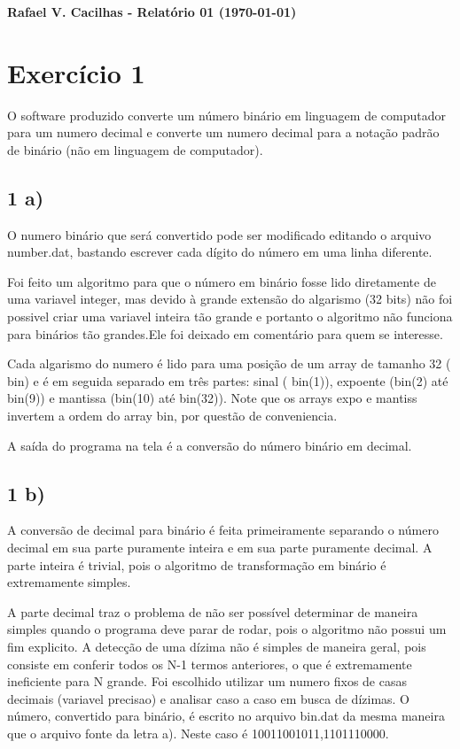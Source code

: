 \documentclass[a4wide]{report}
\begin{document}
\noindent
{\bf Rafael V. Cacilhas  - Relatório 01 (\today)}

\vspace{0.5cm}

\section*{Exercício 1}

O software produzido converte um número binário em linguagem de computador para um numero decimal e converte um numero decimal para a notação padrão de binário (não em linguagem de computador).

\subsection*{1 a) }
O numero binário que será convertido pode ser modificado editando o arquivo number.dat, bastando escrever cada dígito do número em uma linha diferente.

Foi feito um algoritmo para que o número em binário fosse lido diretamente de uma variavel integer, mas devido à grande extensão do algarismo (32 bits) não foi possivel criar uma variavel inteira tão grande e portanto o algoritmo não funciona para binários tão grandes.Ele foi deixado em comentário para quem se interesse.

Cada algarismo do numero é lido para uma posição de um array de tamanho 32 ( bin) e é em seguida separado em três partes: sinal ( bin(1)), expoente (bin(2) até bin(9)) e mantissa (bin(10) até bin(32)). Note que os arrays expo e mantiss invertem a ordem do array bin, por questão de conveniencia.

A saída do programa na tela é a conversão do número binário em decimal.

\subsection*{1 b) }

A conversão de decimal para binário é feita primeiramente separando o número decimal em sua parte puramente inteira e em sua parte puramente decimal. A parte inteira é trivial, pois o algoritmo de transformação em binário é extremamente simples.

A parte decimal traz o problema de não ser possível determinar de maneira simples quando o programa deve parar de rodar, pois o algoritmo não possui um fim explicito. A detecção de uma dízima não é simples de maneira geral, pois consiste em conferir todos os N-1 termos anteriores, o que é extremamente ineficiente para N grande. Foi escolhido utilizar um numero fixos de casas decimais (variavel precisao) e analisar caso a caso em busca de dízimas.
O número, convertido para binário, é escrito no arquivo bin.dat da mesma maneira que o arquivo fonte da letra a). Neste caso é 10011001011,1101110000.
\end{document}
